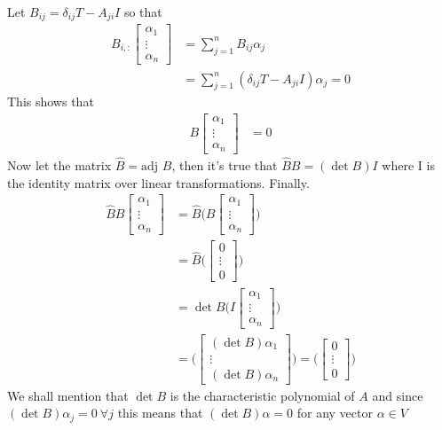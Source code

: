 \documentclass[../../../main.tex]{subfiles}
\begin{document}
Let $B_{ij}= \delta_{ij}T-A_{ji}I$ so that
\begin{align*}
    B_{i,:}\begin{bmatrix}
        \alpha_1\\ \vdots \\ \alpha_n
    \end{bmatrix}
    &= \sum_{j=1}^n B_{ij}\alpha_j\\
    &= \sum_{j=1}^n (\delta_{ij}T-A_{ji}I)\alpha_j=0
\end{align*}
This shows that
\begin{align*}
    B\begin{bmatrix}
        \alpha_1\\ \vdots \\ \alpha_n
    \end{bmatrix}
    &=0
\end{align*}
Now let the matrix $\hat{B}=\text{adj }B$, then it's true that $\hat{B}B = (\det B)I$
where I is the identity matrix over linear transformations. Finally.
\begin{align*}
    \hat{B}B\begin{bmatrix}
        \alpha_1\\ \vdots \\ \alpha_n
    \end{bmatrix}
    &= \hat{B}\Big( B\begin{bmatrix}
        \alpha_1\\ \vdots \\ \alpha_n
    \end{bmatrix}\Big)\\
    &= \hat{B}\Big(\begin{bmatrix}
        0\\ \vdots \\ 0
    \end{bmatrix}\Big)\\
    &= \det B( I \begin{bmatrix}
        \alpha_1\\ \vdots \\ \alpha_n
    \end{bmatrix}\Big)\\
    &= (\begin{bmatrix}
        (\det B)\alpha_1\\ \vdots \\ (\det B)\alpha_n
    \end{bmatrix}\Big)= (\begin{bmatrix}
        0\\ \vdots \\ 0
    \end{bmatrix}\Big)
\end{align*}
We shall mention that $\det B$ is the characteristic polynomial of $A$ and since $(\det B)\alpha_j=0\ \forall j$ this means that $(\det B)\alpha = 0$ for any vector $\alpha\in V$
\end{document}
